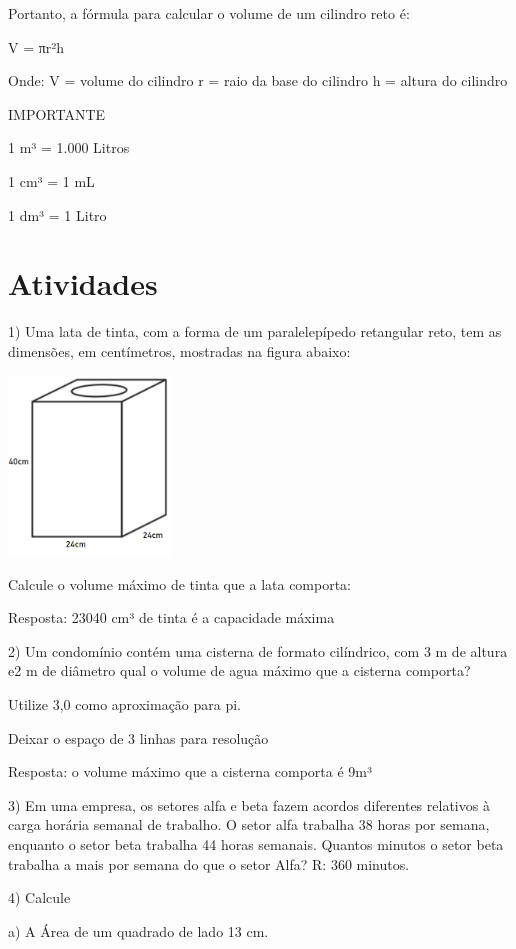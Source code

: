 Portanto, a fórmula para calcular o volume de um cilindro reto é:

V = πr²h

Onde: V = volume do cilindro r = raio da base do cilindro h = altura do
cilindro

IMPORTANTE

1 m³ = 1.000 Litros

1 cm³ = 1 mL

1 dm³ = 1 Litro

\section{Atividades}

1) Uma lata de tinta, com a forma de um paralelepípedo retangular reto,
tem as dimensões, em centímetros, mostradas na figura abaixo:

\includegraphics[width=1.69792in,height=1.88115in]{./imgSAEB_6_MAT/media/image95.png}

Calcule o volume máximo de tinta que a lata comporta:

Resposta: 23040 cm³ de tinta é a capacidade máxima

2) Um condomínio contém uma cisterna de formato cilíndrico, com 3 m de
altura e2 m de diâmetro qual o volume de agua máximo que a cisterna
comporta?

Utilize 3,0 como aproximação para pi.

Deixar o espaço de 3 linhas para resolução

Resposta: o volume máximo que a cisterna comporta é 9m³

3) Em uma empresa, os setores alfa e beta fazem acordos diferentes
relativos à carga horária semanal de trabalho. O setor alfa trabalha 38
horas por semana, enquanto o setor beta trabalha 44 horas semanais.
Quantos minutos o setor beta trabalha a mais por semana do que o setor
Alfa? R: 360 minutos.

4) Calcule

a) A Área de um quadrado de lado 13 cm.

